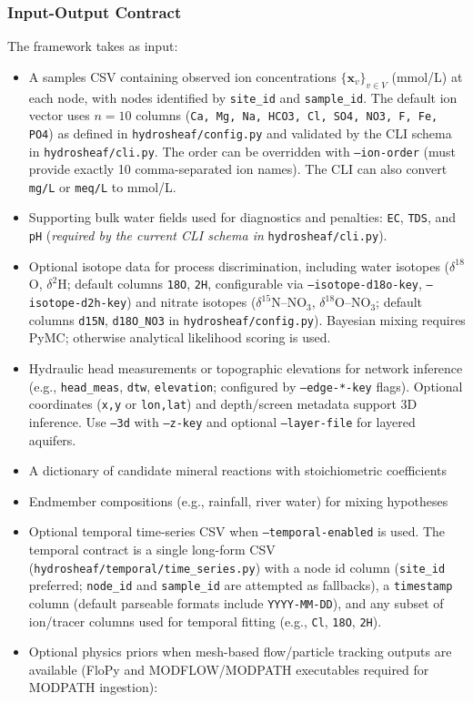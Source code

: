 \documentclass[12pt,a4paper]{article}
\theoremstyle{plain}
\theoremstyle{definition}
\theoremstyle{remark}
\begin{document}
\subsubsection{Input-Output Contract}

The framework takes as input:
\begin{itemize}
	\item A samples CSV containing observed ion concentrations $\{\mathbf{x}_v\}_{v \in V}$ (mmol/L) at each node, with nodes identified by \texttt{site\_id} and \texttt{sample\_id}. The default ion vector uses $n=10$ columns (\texttt{Ca, Mg, Na, HCO3, Cl, SO4, NO3, F, Fe, PO4}) as defined in \texttt{hydrosheaf/config.py} and validated by the CLI schema in \texttt{hydrosheaf/cli.py}. The order can be overridden with \texttt{--ion-order} (must provide exactly 10 comma-separated ion names). The CLI can also convert \texttt{mg/L} or \texttt{meq/L} to mmol/L.
	\item Supporting bulk water fields used for diagnostics and penalties: \texttt{EC}, \texttt{TDS}, and \texttt{pH} (\textit{required by the current CLI schema in} \texttt{hydrosheaf/cli.py}).

	\item Optional isotope data for process discrimination, including water isotopes ($\delta^{18}$O, $\delta^2$H; default columns \texttt{18O}, \texttt{2H}, configurable via \texttt{--isotope-d18o-key}, \texttt{--isotope-d2h-key}) and nitrate isotopes ($\delta^{15}$N--NO$_3$, $\delta^{18}$O--NO$_3$; default columns \texttt{d15N}, \texttt{d18O\_NO3} in \texttt{hydrosheaf/config.py}). Bayesian mixing requires PyMC; otherwise analytical likelihood scoring is used.

	\item Hydraulic head measurements or topographic elevations for network inference (e.g., \texttt{head\_meas}, \texttt{dtw}, \texttt{elevation}; configured by \texttt{--edge-*-key} flags). Optional coordinates (\texttt{x,y} or \texttt{lon,lat}) and depth/screen metadata support 3D inference. Use \texttt{--3d} with \texttt{--z-key} and optional \texttt{--layer-file} for layered aquifers.

	\item A dictionary of candidate mineral reactions with stoichiometric coefficients
	\item Endmember compositions (e.g., rainfall, river water) for mixing hypotheses
	\item Optional temporal time-series CSV when \texttt{--temporal-enabled} is used. The temporal contract is a single long-form CSV (\texttt{hydrosheaf/temporal/time\_series.py}) with a node id column (\texttt{site\_id} preferred; \texttt{node\_id} and \texttt{sample\_id} are attempted as fallbacks), a \texttt{timestamp} column (default parseable formats include \texttt{YYYY-MM-DD}), and any subset of ion/tracer columns used for temporal fitting (e.g., \texttt{Cl}, \texttt{18O}, \texttt{2H}).
	\item Optional physics priors when mesh-based flow/particle tracking outputs are available (FloPy and MODFLOW/MODPATH executables required for MODPATH ingestion):


\end{itemize}
\end{document}
